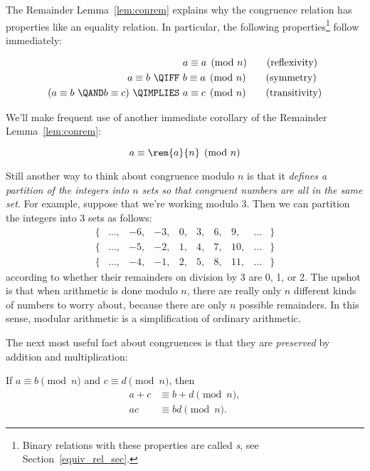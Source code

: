 The Remainder Lemma~\ref{lem:conrem} explains why the congruence
relation has properties like an equality relation.  In particular, the
following properties\footnote{Binary relations with these properties
  are called \emph{s}, see
  Section~\ref{equiv_rel_sec}.}  follow immediately:
\begin{lemma}\label{mod_equiv_rel_lem} \mbox{}
\begin{align}
                  & a \equiv a \pmod{n}\tag{reflexivity}\\
a \equiv b\ \QIFF\ & b \equiv a \pmod{n} \tag{symmetry}\\
(a \equiv b\ \QAND  b \equiv c)\ \QIMPLIES\
                  & a \equiv c \pmod{n} \tag{transitivity}
\end{align}
\end{lemma}

We'll make frequent use of another immediate corollary of the
Remainder Lemma~\ref{lem:conrem}:
\begin{corollary}\label{aran}
\[
a \equiv \rem{a}{n} \pmod{n}
\]
\end{corollary}

Still another way to think about congruence modulo $n$ is that it
\emph{defines a partition of the integers into $n$ sets so that
  congruent numbers are all in the same set}.  For example, suppose
that we're working modulo 3.  Then we can partition the integers into
3 sets as follows:
\[
\begin{array}{cccccccccc}
\{ & \dots, & -6, & -3, & 0, & 3, & 6, & 9, & \dots & \} \\
\{ &
\dots, & -5, & -2, & 1, & 4, & 7, & 10, & \dots & \} \\
\{ & \dots, &
-4, & -1, & 2, & 5, & 8, & 11, & \dots & \}
\end{array}
\]
according to whether their remainders on division by 3 are 0, 1, or 2.
The upshot is that when arithmetic is done modulo $n$, there are really
only $n$ different kinds of numbers to worry about, because there are
only $n$ possible remainders.  In this sense, modular arithmetic is a
simplification of ordinary arithmetic.\iffalse and thus is a good
reasoning tool.\fi

The next most useful fact about congruences is that they are
\emph{preserved} by addition and multiplication:

\begin{lemma}[Congruence]\label{mod_congruence_lem}  If
$a \equiv b \pmod{n}$ and $c \equiv d \pmod{n}$, then
\begin{align}
a + c & \equiv b + d \pmod{n},\label{mod_congruence_lem+}\\
a c   & \equiv b d   \pmod{n}.\label{mod_congruence_lem*}
\end{align}
\end{lemma}

